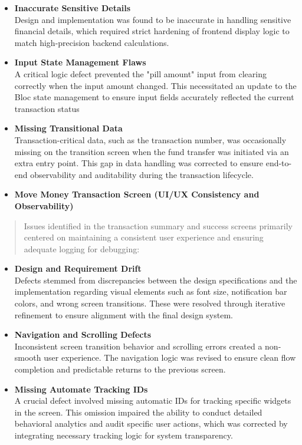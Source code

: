 \begin{itemize}
\item
  \textbf{Inaccurate Sensitive Details}\\
  Design and implementation was found to be inaccurate in handling
  sensitive financial details, which required strict hardening of
  frontend display logic to match high-precision backend calculations.
\item
  \textbf{Input State Management Flaws\\
  }A critical logic defect prevented the "pill amount" input from
  clearing correctly when the input amount changed. This necessitated an
  update to the Bloc state management to ensure input fields accurately
  reflected the current transaction status
\item
  \textbf{Missing Transitional Data\\
  }Transaction-critical data, such as the transaction number, was
  occasionally missing on the transition screen when the fund transfer
  was initiated via an extra entry point. This gap in data handling was
  corrected to ensure end-to-end observability and auditability during
  the transaction lifecycle.
\end{itemize}

\begin{itemize}
\item
  \textbf{Move Money Transaction Screen (UI/UX Consistency and
  Observability)}
\end{itemize}

\begin{quote}
Issues identified in the transaction summary and success screens
primarily centered on maintaining a consistent user experience and
ensuring adequate logging for debugging:
\end{quote}

\begin{itemize}
\item
  \textbf{Design and Requirement Drift\\
  }Defects stemmed from discrepancies between the design specifications
  and the implementation regarding visual elements such as font size,
  notification bar colors, and wrong screen transitions. These were
  resolved through iterative refinement to ensure alignment with the
  final design system.
\item
  \textbf{Navigation and Scrolling Defects\\
  }Inconsistent screen transition behavior and scrolling errors created
  a non-smooth user experience. The navigation logic was revised to
  ensure clean flow completion and predictable returns to the previous
  screen.
\item
  \textbf{Missing Automate Tracking IDs\\
  }A crucial defect involved missing automatic IDs for tracking specific
  widgets in the screen. This omission impaired the ability to conduct
  detailed behavioral analytics and audit specific user actions, which
  was corrected by integrating necessary tracking logic for system
  transparency.
\end{itemize}

